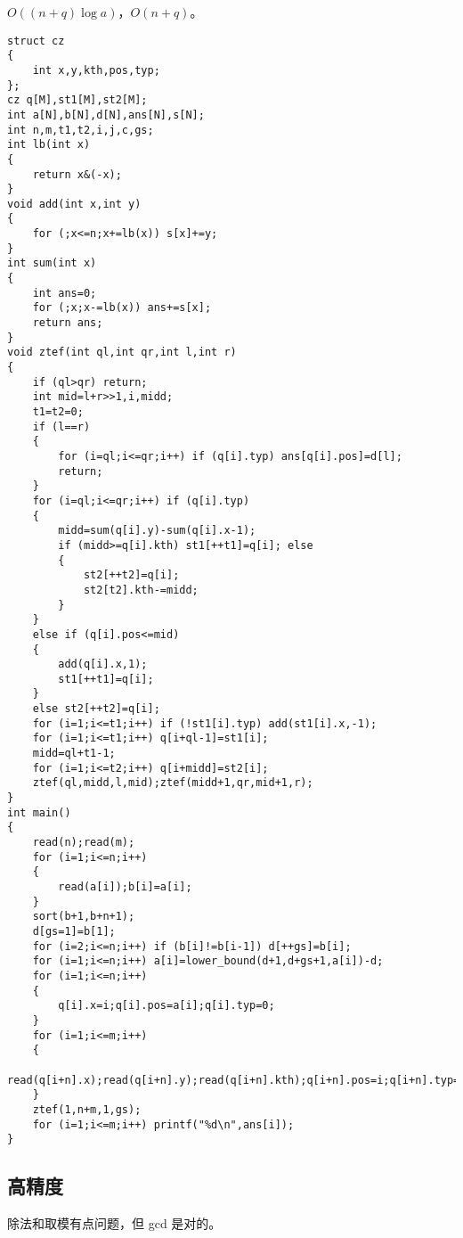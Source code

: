 \documentclass[12pt]{ctexart}
\begin{document}
$O((n+q)\log a)$，$O(n+q)$。

\begin{lstlisting}
struct cz
{
	int x,y,kth,pos,typ;
};
cz q[M],st1[M],st2[M];
int a[N],b[N],d[N],ans[N],s[N];
int n,m,t1,t2,i,j,c,gs;
int lb(int x)
{
	return x&(-x);
}
void add(int x,int y)
{
	for (;x<=n;x+=lb(x)) s[x]+=y;
}
int sum(int x)
{
	int ans=0;
	for (;x;x-=lb(x)) ans+=s[x];
	return ans;
}
void ztef(int ql,int qr,int l,int r)
{
	if (ql>qr) return;
	int mid=l+r>>1,i,midd;
	t1=t2=0;
	if (l==r)
	{
		for (i=ql;i<=qr;i++) if (q[i].typ) ans[q[i].pos]=d[l];
		return;
	}
	for (i=ql;i<=qr;i++) if (q[i].typ)
	{
		midd=sum(q[i].y)-sum(q[i].x-1);
		if (midd>=q[i].kth) st1[++t1]=q[i]; else
		{
			st2[++t2]=q[i];
			st2[t2].kth-=midd;
		}
	}
	else if (q[i].pos<=mid)
	{
		add(q[i].x,1);
		st1[++t1]=q[i];
	}
	else st2[++t2]=q[i];
	for (i=1;i<=t1;i++) if (!st1[i].typ) add(st1[i].x,-1);
	for (i=1;i<=t1;i++) q[i+ql-1]=st1[i];
	midd=ql+t1-1;
	for (i=1;i<=t2;i++) q[i+midd]=st2[i];
	ztef(ql,midd,l,mid);ztef(midd+1,qr,mid+1,r);
}
int main()
{
	read(n);read(m);
	for (i=1;i<=n;i++)
	{
		read(a[i]);b[i]=a[i];
	}
	sort(b+1,b+n+1);
	d[gs=1]=b[1];
	for (i=2;i<=n;i++) if (b[i]!=b[i-1]) d[++gs]=b[i];
	for (i=1;i<=n;i++) a[i]=lower_bound(d+1,d+gs+1,a[i])-d;
	for (i=1;i<=n;i++)
	{
		q[i].x=i;q[i].pos=a[i];q[i].typ=0;
	}
	for (i=1;i<=m;i++)
	{
		read(q[i+n].x);read(q[i+n].y);read(q[i+n].kth);q[i+n].pos=i;q[i+n].typ=1;
	}
	ztef(1,n+m,1,gs);
	for (i=1;i<=m;i++) printf("%d\n",ans[i]);
}
\end{lstlisting}

\subsection{高精度}

除法和取模有点问题，但 gcd 是对的。
\end{document}

